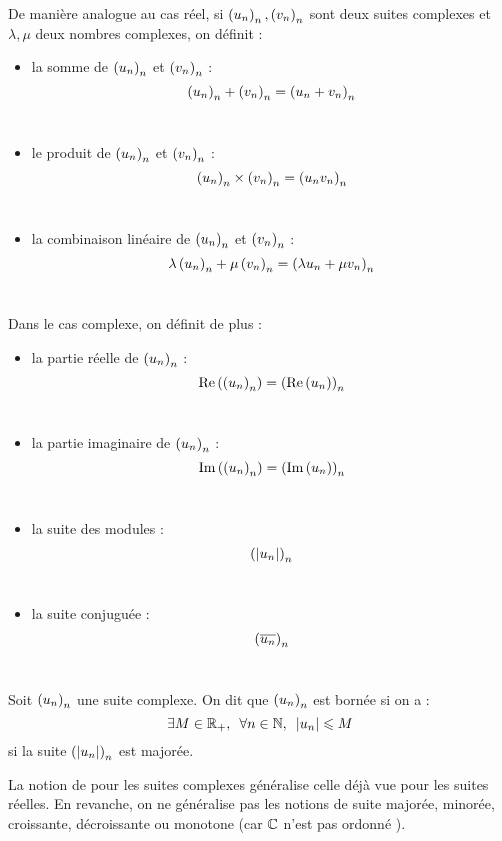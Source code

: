 \begin{defi}
De manière analogue au cas réel, si \(\left(u_n\right)_n,\left(v_n\right)_n\) sont deux suites complexes et \(\lambda,\mu\) deux nombres complexes, on définit :

\begin{itemize}
\item la somme de \(\left(u_n\right)_n\) et \(\left(v_n\right)_n\) : \[\left(u_n\right)_n+\left(v_n\right)_n=\left(u_n+v_n\right)_n\] \\

\item le produit de \(\left(u_n\right)_n\) et \(\left(v_n\right)_n\) : \[\left(u_n\right)_n\times\left(v_n\right)_n=\left(u_nv_n\right)_n\] \\

\item la combinaison linéaire de \(\left(u_n\right)_n\) et \(\left(v_n\right)_n\) : \[\lambda\left(u_n\right)_n+\mu\left(v_n\right)_n=\left(\lambda u_n+\mu v_n\right)_n\] \\
\end{itemize}

Dans le cas complexe, on définit de plus :

\begin{itemize}
\item la partie réelle de \(\left(u_n\right)_n\) : \[\operatorname{Re}\left(\left(u_n\right)_n\right)=\left(\operatorname{Re}\left(u_n\right)\right)_n\] \\

\item la partie imaginaire de \(\left(u_n\right)_n\) : \[\operatorname{Im}\left(\left(u_n\right)_n\right)=\left(\operatorname{Im}\left(u_n\right)\right)_n\] \\

\item la suite des modules : \[\left(\left\lvert u_n\right\rvert\right)_n\] \\

\item la suite conjuguée : \[\left(\overline{u_n}\right)_n\] \\
\end{itemize}
\end{defi}

\begin{defi}
Soit \(\left(u_n\right)_n\) une suite complexe. On dit que \(\left(u_n\right)_n\) est bornée si on a : \[\quantifs{\exists M\in\Rp;\forall n\in\N}\abs{u_n}\leq M\] \cad si la suite \(\left(\left\lvert u_n\right\rvert\right)_n\) est majorée.
\end{defi}

\begin{rem}
La notion de  pour les suites complexes généralise celle déjà vue pour les suites réelles. En revanche, on ne généralise pas les notions de suite majorée, minorée, croissante, décroissante ou monotone (car \(\mathbb{C}\) n'est pas ordonné ).
\end{rem}


